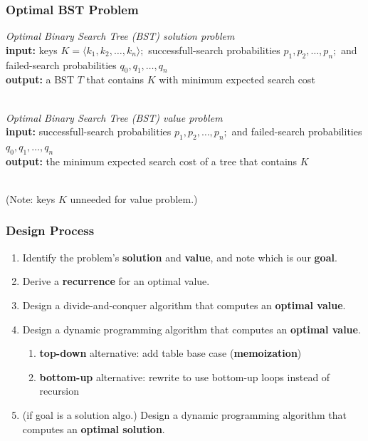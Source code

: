 \documentclass{beamer}
\newcommand{\stanza}{ \\~\ }
\begin{document}
\begin{frame} \frametitle{Optimal BST Problem}

  \emph{Optimal Binary Search Tree (BST) solution problem} \\
  \textbf{input:} keys $K=\langle k_1, k_2, \ldots, k_n \rangle;$ successfull-search probabilities $p_1, p_2, \ldots, p_n;$ and failed-search probabilities $q_0, q_1, \ldots, q_n$ \\  
  \textbf{output:} a BST $T$ that contains $K$ with minimum expected search cost  \stanza
  
  \emph{Optimal Binary Search Tree (BST) value problem} \\
  \textbf{input:} successfull-search probabilities $p_1, p_2, \ldots, p_n;$ and failed-search probabilities $q_0, q_1, \ldots, q_n$ \\  
  \textbf{output:} the minimum expected search cost of a tree that contains $K$ \stanza

  (Note: keys $K$ unneeded for value problem.)
\end{frame}

\begin{frame} \frametitle{Design Process}
  \begin{enumerate}
    \item Identify the problem's \textbf{solution} and \textbf{value}, and note which is our \textbf{goal}.
    \item Derive a \textbf{recurrence} for an optimal value.
    \item Design a divide-and-conquer algorithm that computes an \textbf{optimal value}.
    \item Design a dynamic programming algorithm that computes an \textbf{optimal value}.
    \begin{enumerate}
      \item \textbf{top-down} alternative: add table base case (\textbf{memoization})
      \item \textbf{bottom-up} alternative: rewrite to use bottom-up loops instead of recursion
    \end{enumerate}
    \item (if goal is a solution algo.) Design a dynamic programming algorithm that computes an \textbf{optimal solution}.
  \end{enumerate}
  \end{frame}
\end{document}
